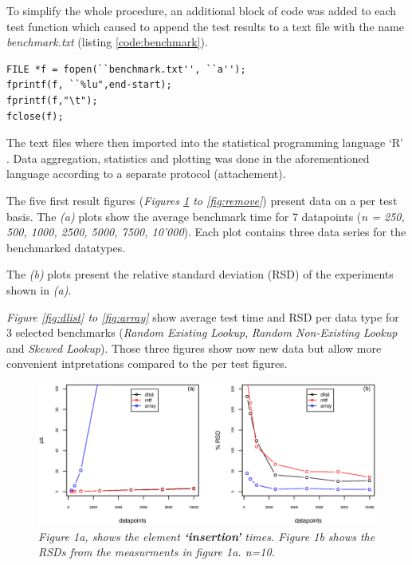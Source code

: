\documentclass[a4paper,11pt,twoside]{article}
\begin{document}
To simplify the whole procedure, an additional block of code was added
to each test function which caused to append the test results to a text
file with the name \emph{benchmark.txt} (listing \ref{code:benchmark}).

\begin{lstlisting}[label=code:benchmark,caption=code block for writing
  benchmark data to file]
FILE *f = fopen(``benchmark.txt'', ``a'');
fprintf(f, ``%lu",end-start);
fprintf(f,"\t");
fclose(f);
\end{lstlisting}

The text files where then imported into the statistical programming language `R'
\cite{rlanguage}. Data aggregation, statistics and plotting was done
in the aforementioned language according to a separate protocol
(attachement).

The five first result figures (\textit{Figures \ref{fig:insertion} to
\ref{fig:remove}}) present data on a per test basis. The
\textit{(a)} plots show the average benchmark time for 7 datapoints 
(\textit{n = 250, 500, 1000, 2500, 5000, 7500, 10'000}). Each plot
contains three data series for the benchmarked datatypes.

The \textit{(b)} plots present the relative standard deviation (RSD)
of the experiments shown in \textit{(a)}. 

\textit{Figure \ref{fig:dlist} to \ref{fig:array}} show average test time and
RSD per data type for 3 selected benchmarks (\emph{Random Existing Lookup},
\emph{Random Non-Existing Lookup} and \emph{Skewed Lookup}). Those three figures
show now new data but allow more convenient intpretations compared to
the per test figures.

\begin{figure}[H] 
\centering 
\includegraphics[width=\textwidth]{figures/fig1.eps}
\caption{\textit{Figure 1a, shows the element \textbf{`insertion'}
    times. Figure 1b shows the RSDs from the measurments in figure 1a. n=10.}}
\label{fig:insertion}
\end{figure}
\end{document}
